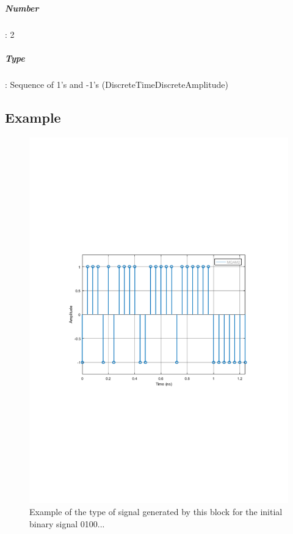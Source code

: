 \subparagraph*{Number}: 2

\subparagraph*{Type}: Sequence of 1's and -1's (DiscreteTimeDiscreteAmplitude)

\subsection*{Example}

\begin{figure}[h]
	\centering
	\includegraphics[clip, trim=0.5cm 9cm 0.5cm 9cm, width=\textwidth]{./lib/m_qam_mapper/figures/MQAM_mapper_output.pdf}
	
	\caption{Example of the type of signal generated by this block for the initial binary signal 0100... }\label{DeterministicAppendZeros}

\end{figure}

